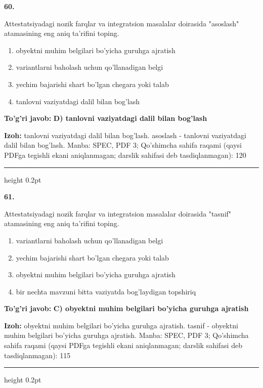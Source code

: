 \documentclass[10pt,a4paper]{article}
\begin{document}
{\bfseries\sffamily\color{ink} 60.}
\par
Attestatsiyadagi nozik farqlar va integratsion masalalar doirasida "asoslash" atamasining eng aniq ta'rifini toping.
\begin{enumerate}[label=\Alph*),leftmargin=9mm]
\item obyektni muhim belgilari bo'yicha guruhga ajratish
\item variantlarni baholash uchun qo'llanadigan belgi
\item yechim bajarishi shart bo'lgan chegara yoki talab
\item tanlovni vaziyatdagi dalil bilan bog'lash
\end{enumerate}
\begin{tcolorbox}[enhanced,breakable,colback=teal!4,colframe=teal!60!black,boxrule=0.45pt,arc=1.2mm,left=2.7mm,right=2.7mm,top=1.8mm,bottom=1.8mm,before skip=2mm,after skip=2mm]
{\bfseries\sffamily\color{teal}To'g'ri javob:} \textbf{D) tanlovni vaziyatdagi dalil bilan bog'lash}
\par\smallskip
{\bfseries Izoh:} tanlovni vaziyatdagi dalil bilan bog'lash. asoslash - tanlovni vaziyatdagi dalil bilan bog'lash. Manba: SPEC, PDF 3; Qo'shimcha sahifa raqami (qaysi PDFga tegishli ekani aniqlanmagan; darslik sahifasi deb tasdiqlanmagan): 120
\end{tcolorbox}
\vspace{2mm}\hrule height 0.2pt\vspace{3mm}

{\bfseries\sffamily\color{ink} 61.}
\par
Attestatsiyadagi nozik farqlar va integratsion masalalar doirasida "tasnif" atamasining eng aniq ta'rifini toping.
\begin{enumerate}[label=\Alph*),leftmargin=9mm]
\item variantlarni baholash uchun qo'llanadigan belgi
\item yechim bajarishi shart bo'lgan chegara yoki talab
\item obyektni muhim belgilari bo'yicha guruhga ajratish
\item bir nechta mavzuni bitta vaziyatda bog'laydigan topshiriq
\end{enumerate}
\begin{tcolorbox}[enhanced,breakable,colback=teal!4,colframe=teal!60!black,boxrule=0.45pt,arc=1.2mm,left=2.7mm,right=2.7mm,top=1.8mm,bottom=1.8mm,before skip=2mm,after skip=2mm]
{\bfseries\sffamily\color{teal}To'g'ri javob:} \textbf{C) obyektni muhim belgilari bo'yicha guruhga ajratish}
\par\smallskip
{\bfseries Izoh:} obyektni muhim belgilari bo'yicha guruhga ajratish. tasnif - obyektni muhim belgilari bo'yicha guruhga ajratish. Manba: SPEC, PDF 3; Qo'shimcha sahifa raqami (qaysi PDFga tegishli ekani aniqlanmagan; darslik sahifasi deb tasdiqlanmagan): 115
\end{tcolorbox}
\vspace{2mm}\hrule height 0.2pt\vspace{3mm}
\end{document}
